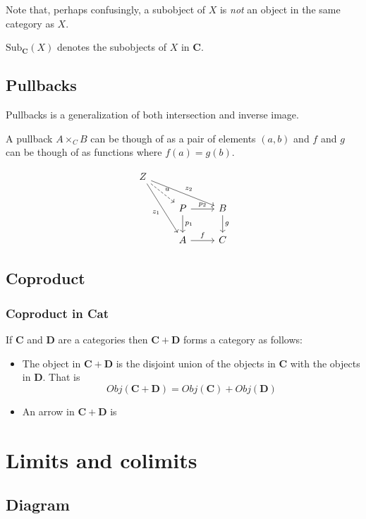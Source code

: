 \documentclass{book}
\theoremstyle{definition}
\begin{document}
Note that, perhaps confusingly, a subobject of $X$ is \emph{not} an object in
the same category as $X$.

$\text{Sub}_{\mathbf{C}}(X)$ denotes the subobjects of $X$ in \textbf{C}.

\section{Pullbacks}

Pullbacks is a generalization of both intersection and inverse
image. %

A pullback $A \times_{C} B$ can be though of as a pair of elements $(a, b)$ and
$f$ and $g$ can be though of as functions where $f(a) = g(b)$.

\[
  \begin{tikzcd}
    Z \ar[dr, dashed, "u"] \ar[drr, "z_{2}"] \ar[ddr, "z_{1}"'] & & \\
    & P \ar[r, "p_{2}"] \ar[d, "p_{1}"] & B \ar[d, "g"] \\
    & A \ar[r, "f"] & C
  \end{tikzcd}
\]

\section{Coproduct}

\subsection{Coproduct in \textbf{Cat}}

If \textbf{C} and \textbf{D} are a categories then $\mathbf{C} + \mathbf{D}$
forms a category as follows:

\begin{itemize}
\item The object in $\mathbf{C} + \mathbf{D}$ is the disjoint union of the
  objects in $\mathbf{C}$ with the objects in $\mathbf{D}$. That is
  \[
    Obj(\mathbf{C} + \mathbf{D}) = Obj(\mathbf{C}) + Obj(\mathbf{D})
  \]
\item An arrow in $\mathbf{C} + \mathbf{D}$ is 
\end{itemize}

\chapter{Limits and colimits}

\section{Diagram}
\end{document}
